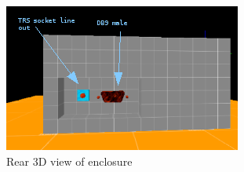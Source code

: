 \documentclass[bibtotocnumbered,abstract=on,paper=a4,fontsize=12pt,parskip=on,halfparskip=on]{scrartcl}		%
\begin{document}
      \begin{figure}[H]
        \centering
          \includegraphics[width=\linewidth]{img/fig_mechanical1}
          \caption{Rear 3D view of enclosure}
          \label{fig:3d2}
      \end{figure}
\end{document}
